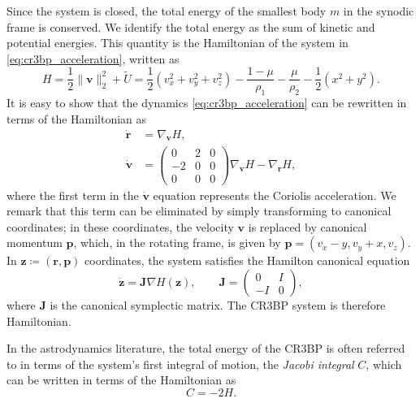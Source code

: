 Since the system is closed, the total energy of the smallest body $m$ in the synodic frame is conserved. We identify the total energy as the sum of kinetic and potential energies. This quantity is the Hamiltonian of the system in \eqref{eq:cr3bp_acceleration}, written as
\begin{equation} \label{eq:hamiltonian_definition}
    H = \frac{1}{2}\|\boldsymbol{v}\|_2^2 + \tilde{U} = \frac{1}{2}\left(v_x^2 + v_y^2 +v_z^2\right) -\frac{1-\mu}{\rho_1} - \frac{\mu}{\rho_2} -\frac{1}{2}\left(x^2 + y^2\right).
\end{equation}
It is easy to show that the dynamics \eqref{eq:cr3bp_acceleration} can be rewritten in terms of the Hamiltonian as 
\begin{align*}
    \dot{\boldsymbol{r}} &= \nabla_{\boldsymbol{v}} H, \\
    \dot{\boldsymbol{v}} &= 
    \begin{pmatrix}
        0 & 2 & 0 \\
        -2 & 0 & 0 \\
        0 & 0 & 0
    \end{pmatrix}
    \nabla_{\boldsymbol{v}} H
    - \nabla_{\boldsymbol{r}} H,
\end{align*}
where the first term in the $\dot{\boldsymbol{v}}$ equation represents the Coriolis acceleration. We remark that this term can be eliminated by simply transforming to canonical coordinates; in these coordinates, the velocity $\boldsymbol{v}$ is replaced by canonical momentum $\boldsymbol{p}$, which, in the rotating frame, is given by $\boldsymbol{p} = (v_x -y, v_y+x, v_z)$. In $\boldsymbol{z} \coloneq(\boldsymbol{r}, \boldsymbol{p})$ coordinates, the system satisfies the Hamilton canonical equation
\begin{equation} \label{eq:hamilton_canonical_equation}
    \dot{\boldsymbol{z}} = \boldsymbol{J} \nabla H(\boldsymbol{z}), \qquad
    \boldsymbol{J} = \begin{pmatrix}
    0 & I \\
    - I & 0
    \end{pmatrix},
\end{equation}
where $\boldsymbol{J}$ is the canonical symplectic matrix. The CR3BP system is therefore Hamiltonian.


\clearpage

In the astrodynamics literature, the total energy of the CR3BP is often referred to in terms of the system's first integral of motion, the \emph{Jacobi integral} $C$, which can be written in terms of the Hamiltonian as
\begin{equation} \label{eq:jacobi_integral}
    C = -2H.
\end{equation}


